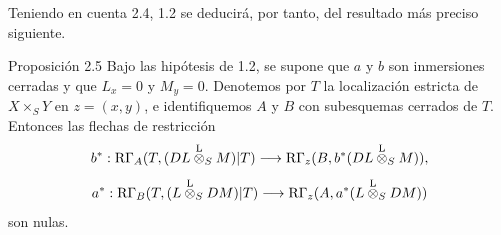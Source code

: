 Teniendo en cuenta 2.4, 1.2 se deducirá, por tanto, del resultado más preciso siguiente.

\begin{statement}{Proposición 2.5}
Bajo las hipótesis de 1.2, se supone que $a$ y $b$ son inmersiones cerradas y que $L_x=0$ y $M_y=0$. Denotemos por $T$ la localización estricta de $X\times_SY$ en $z=(x,y)$, e identifiquemos $A$ y $B$ con subesquemas cerrados de $T$. Entonces las flechas de restricción
\[
b^*:\mathrm R\Gamma_A(T,(DL\overset{\mathrm L}{\otimes}_SM)|T)
 \longrightarrow \mathrm R\Gamma_z(B,b^*(DL\overset{\mathrm L}{\otimes}_SM)),
\]
\[
a^*:\mathrm R\Gamma_B(T,(L\overset{\mathrm L}{\otimes}_SDM)|T)
 \longrightarrow \mathrm R\Gamma_z(A,a^*(L\overset{\mathrm L}{\otimes}_SDM))
\]
son nulas.
\end{statement}
